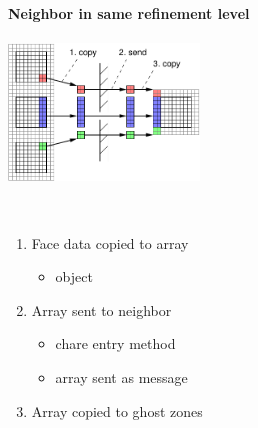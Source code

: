 \NEWSEC

\subsection{\ssRefresh}


\begin{frame}[fragile,label=ss-refresh] 
\secframetitle{\ssRefresh}
\framesubtitle{Neighbor in same refinement level}
\begin{minipage}{2.0in}
\begin{center}
   \includegraphics[width=2.0in]{refresh-same.pdf} \ \\
\end{center}
\end{minipage} \ 
\begin{minipage}{2.1in}
\begin{enumerate}
\item Face data copied to array
\begin{itemize}
\item {} object
\end{itemize}
\item Array sent to neighbor
\begin{itemize}
\item chare entry method
\item array sent as message
\end{itemize}
\item Array copied to ghost zones
\end{enumerate}
\end{minipage}
\vspace{0.2in}
\ \\
\ \\
\end{frame}

